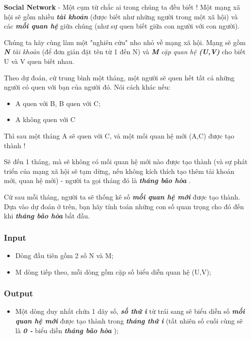 



\textbf{    Social Network   }   - Một cụm từ chắc ai trong chúng ta đều biết ! Một mạng xã hội sẽ gồm nhiều   \emph{\textbf{     tài khoản    }}   (được biết như những người trong một xã hội) và các   \emph{\textbf{     mối quan hệ    }}   giữa chúng (như sự quen biết giữa con người với con người).  

   Chúng ta hãy cùng làm một "nghiên cứu" nho nhỏ về mạng xã hội. Mạng sẽ gồm   \emph{\textbf{     N    }    tài khoản   }   (để đơn giản đặt tên từ 1 đến N) và   \emph{\textbf{     M    }    cặp quan hệ    \textbf{     (U,V)    }}   cho biết U và V quen biết nhau.  

   Theo dự đoán, cứ trung bình một tháng, một người sẽ quen hết tất cả những người có quen với bạn của người đó. Nói cách khác nếu:  
\begin{itemize}
	\item     A quen với B, B quen với C;   
	\item     A không quen với C   
\end{itemize}

   Thì sau một tháng A sẽ quen với C, và một mối quan hệ mới (A,C) được tạo thành !  

   Sẽ đến 1 tháng, mà sẽ không có mối quan hệ mới nào được tạo thành (và sự phát triển của mạng xã hội sẽ tạm dừng, nếu không kích thích tạo thêm tài khoản mới, quan hệ mới) - người ta gọi tháng đó là   \emph{\textbf{     tháng bão hòa    }}   .  

   Cứ sau mỗi tháng, người ta sẽ thống kê số   \emph{\textbf{     mối quan hệ mới    }}   được tạo thành. Dựa vào dự đoán ở trên, bạn hãy tính toán những con số quan trọng cho đó đến khi   \emph{\textbf{     tháng bão hòa    }}   bắt đầu.  

\subsubsection{   Input  }
\begin{itemize}
	\item     Dòng đầu tiên gồm 2 số N và M;   
	\item     M dòng tiếp theo, mỗi dòng gồm cặp số biểu diễn quan hệ (U,V);   
\end{itemize}

\subsubsection{   Output  }
\begin{itemize}
	\item     Một dòng duy nhất chứa 1 dãy số,    \emph{\textbf{      số thứ i     }}    từ trái sang sẽ biểu diễn số    \emph{\textbf{      mối quan hệ mới     }}    được tạo thành trong    \emph{\textbf{      tháng thứ i     }}    (tất nhiên số cuối cùng sẽ là    \emph{\textbf{      0 -     }}    biểu diễn    \emph{\textbf{      tháng bão hòa     }}    );   
\end{itemize}

